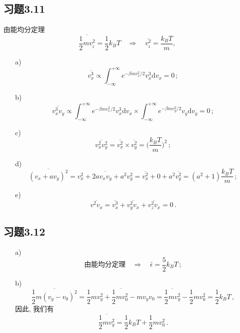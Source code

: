 \documentclass[letterpaper, 10pt]{article}
\newcommand{\dd}{\mathrm{d}}
\begin{document}
\subsection{习题3.11}
由能均分定理
\[ \overline{\frac{1}{2} m v_{i}^2} = \frac{1}{2} k_{B}T \quad{} \Rightarrow \quad{} \overline{v_{i}^2} = \frac{k_{B}T}{m}, \]
\begin{itemize}
	\item[a)]
	\[ \overline{v_{x}^3} \propto \int_{-\infty}^{+\infty} e^{-\beta m v_{x}^2/2} v_{x}^3 \dd v_{x} = 0\,;  \]
	\item[b)]
	\[ \overline{v_{x}^3 v_{y}} \propto \int_{-\infty}^{+\infty} e^{-\beta mv_{x}^2/2} v_{x}^3 \dd v_{x} \times \int_{-\infty}^{+\infty} e^{-\beta mv_{y}^2/2} v_{y} \dd v_{y} = 0\,; \]
	\item[c)]
	\[ \overline{v_{x}^2 v_{y}^2} = \overline{v_{x}^2} \times \overline{v_{y}^2} = \bigg( \frac{k_{B}T}{m} \bigg)^2\,; \]
	\item[d)]
	\[ \overline{(v_{x}+av_{y})^2} = \overline{v_{x}^2 + 2a v_{x} v_{y} + a^2 v_{y}^2} = \overline{v_{x}^2} + 0 + a^2 \overline{v_{y}^2} = (a^2+1) \frac{k_{B}T}{m}\,; \]
	\item[e)]
	\[ \overline{v^2 v_{x}} = \overline{v_{x}^3} + \overline{v_{y}^2 v_{x}} + \overline{v_{z}^2 v_{x}} = 0\,. \]
\end{itemize}

\subsection{习题3.12}
\begin{itemize}
	\item[a)]
	\[ \text{由能均分定理} \quad{} \Rightarrow \quad{} \bar{\epsilon} = \frac{5}{2} k_{B}T\,; \]
	\item[b)]
	\[ \overline{\frac{1}{2}m(v_{y}-v_{0})^2} = \overline{\frac{1}{2}m v_{y}^2 + \frac{1}{2} m v_{0}^2 - mv_{y}v_{0}} = \overline{\frac{1}{2}mv_{y}^2} - \frac{1}{2} m v_{0}^2 = \frac{1}{2} k_{B}T\,, \]
	因此, 我们有
	\[ \overline{\frac{1}{2}mv_{y}^2} = \frac{1}{2} k_{B}T + \frac{1}{2} m v_{0}^2\,. \]
\end{itemize}
\end{document}
